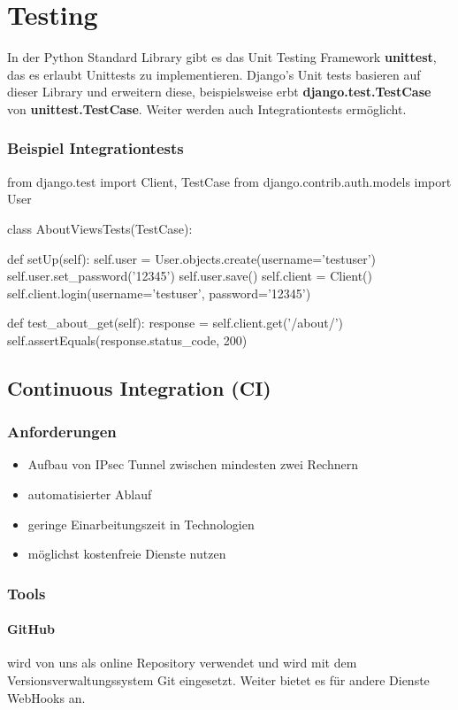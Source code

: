 \section{Testing}
In der Python Standard Library gibt es das Unit Testing Framework \textbf{unittest}, das es erlaubt Unittests zu implementieren. 
Django's Unit tests basieren auf dieser Library und erweitern diese, beispielsweise erbt \textbf{django.test.TestCase} von \textbf{unittest.TestCase}. Weiter werden auch Integrationtests ermöglicht.

\subsubsection{Beispiel Integrationtests}
\begin{python}
from django.test import Client, TestCase
from django.contrib.auth.models import User

class AboutViewsTests(TestCase):

   def setUp(self):
       self.user = User.objects.create(username='testuser')
       self.user.set_password('12345')
       self.user.save()
       self.client = Client()
       self.client.login(username='testuser', password='12345')

   def test_about_get(self):
       response = self.client.get('/about/')
       self.assertEquals(response.status_code, 200)      
\end{python}

\subsection{Continuous Integration (CI)}
\subsubsection{Anforderungen}
\begin{itemize}
	\item Aufbau von IPsec Tunnel zwischen mindesten zwei Rechnern
	\item automatisierter Ablauf
	\item geringe Einarbeitungszeit in Technologien
	\item möglichst kostenfreie Dienste nutzen
\end{itemize}
\subsubsection{Tools}
\paragraph{GitHub} wird von uns als online Repository verwendet und wird mit dem Versionsverwaltungssystem Git eingesetzt. Weiter bietet es für andere Dienste WebHooks an. 
